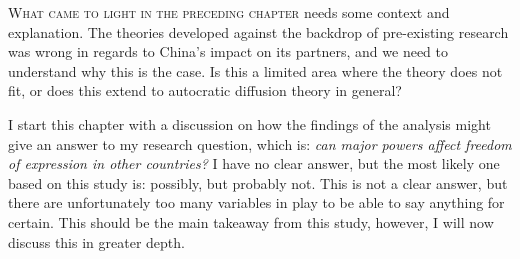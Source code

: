 \lettrine{W}{hat came to light in the preceding chapter} needs some context and explanation. The theories developed against the backdrop of pre-existing research was wrong in regards to China's impact on its partners, and we need to understand why this is the case. Is this a limited area where the theory does not fit, or does this extend to autocratic diffusion theory in general?

I start this chapter with a discussion on how the findings of the analysis might give an answer to my research question, which is: \textit{can major powers affect freedom of expression in other countries?} I have no clear answer, but the most likely one based on this study is: possibly, but probably not. This is not a clear answer, but there are unfortunately too many variables in play to be able to say anything for certain. This should be the main takeaway from this study, however, I will now discuss this in greater depth.

\section{}
